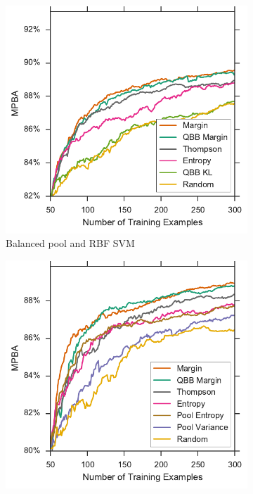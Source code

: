 \begin{figure}[p]
\begin{subfigure}{.5\textwidth}
		\includegraphics[width=\linewidth]{figures/5_active/sdss_br_ind_upper}
		\caption{Balanced pool and RBF SVM}
		\label{fig:sdss_br_ind_upper}
	\end{subfigure}
	\begin{subfigure}{.5\textwidth}
		\centering
		\includegraphics[width=\textwidth]{figures/5_active/sdss_ul_ind_upper}

\end{subfigure}
\end{figure}
